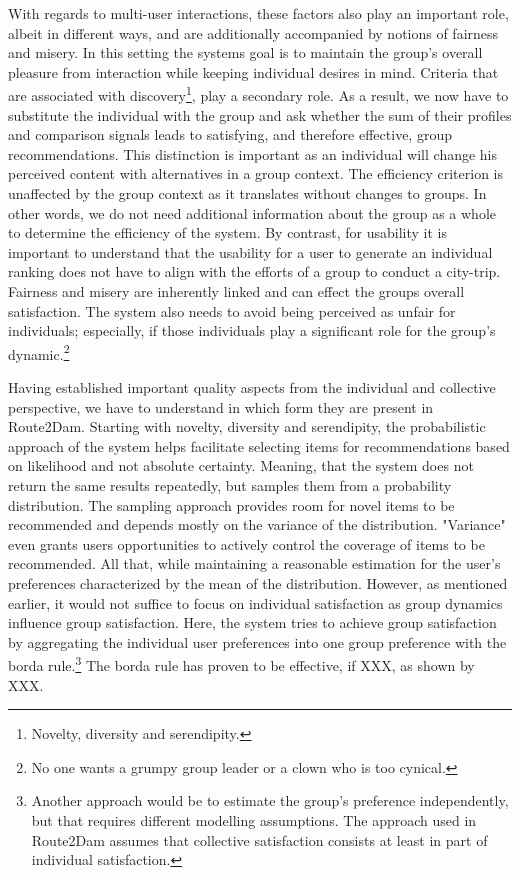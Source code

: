 \documentclass[11pt,a4paper,oneside]{article}
\begin{document}
With regards to multi-user interactions, these factors also play an important role, albeit in different ways, and are additionally accompanied by notions of fairness and misery.\cite{CITE-Jameson} In this setting the systems goal is to maintain the group's overall pleasure from interaction while keeping individual desires in mind.\cite{CITE} Criteria that are associated with discovery\footnote{Novelty, diversity and serendipity.}, play a secondary role.\cite{CITE-COMPLACENCY-IN-GROUPs} As a result, we now have to substitute the individual with the group and ask whether the sum of their profiles and comparison signals leads to satisfying, and therefore effective, group recommendations. This distinction is important as an individual will change his perceived content with alternatives in a group context.\cite{asch_OpinionsSocialPressure_1955} The efficiency criterion is unaffected by the group context as it translates without changes to groups. In other words, we do not need additional information about the group as a whole to determine the efficiency of the system. By contrast, for usability it is important to understand that the usability for a user to generate an individual ranking does not have to align with the efforts of a group to conduct a city-trip. Fairness and misery are inherently linked and can effect the groups overall satisfaction.\cite{CITE} The system also needs to avoid being perceived as unfair for individuals; especially, if those individuals play a significant role for the group's dynamic.\footnote{No one wants a grumpy group leader or a clown who is too cynical.\cite{CITE}}       

Having established important quality aspects from the individual and collective perspective, we have to understand in which form they are present in Route2Dam. Starting with novelty, diversity and serendipity, the probabilistic approach of the system helps facilitate selecting items for recommendations based on likelihood and not absolute certainty. Meaning, that the system does not return the same results repeatedly, but samples them from a probability distribution. The sampling approach provides room for novel items to be recommended and depends mostly on the variance of the distribution. "Variance" even grants users opportunities to actively control the coverage of items to be recommended. All that, while maintaining a reasonable estimation for the user's preferences characterized by the mean of the distribution. However, as mentioned earlier, it would not suffice to focus on individual satisfaction as group dynamics influence group satisfaction.\cite{CITE} Here, the system tries to achieve group satisfaction by aggregating the individual user preferences into one group preference with the borda rule.\footnote{Another approach would be to estimate the group's preference independently, but that requires different modelling assumptions.\cite{CITE} The approach used in Route2Dam assumes that collective satisfaction consists at least in part of individual satisfaction.} The borda rule has proven to be effective, if XXX, as shown by XXX.\cite{CITE}
\end{document}
